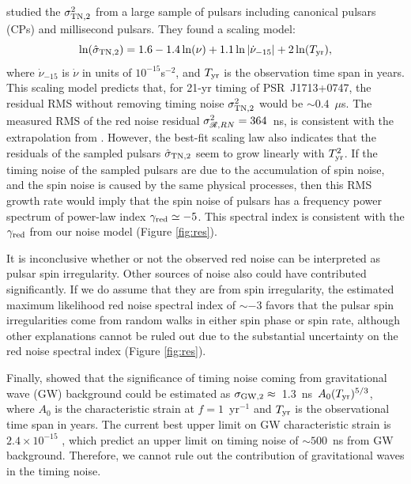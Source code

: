 \citet{sc10} studied the $\sigma^2_{\rm TN,2}$ from a large sample of pulsars
including canonical pulsars (CPs) and millisecond pulsars. They found a scaling
model:
\begin{equation}
\label{eq:sc10}
\ln(\hat{\sigma}_{\rm TN,2}) = 1.6 - 1.4\ln(\nu) +
1.1\ln|\dot{\nu}_{-15}|+2\ln(T_{\rm yr}),
\end{equation}
where $\dot{\nu}_{-15}$ is $\dot{\nu}$ in units of $10^{-15}$s$^{-2}$, and $T_{\rm yr}$
is the observation time span in years.
This scaling model predicts that, for 21-yr timing of PSR~J1713+0747, the
residual RMS without removing timing noise $\sigma^2_{\rm TN,2}$ would be
$\sim0.4$~$\mu $s. The measured RMS of the red noise residual 
$\sigma^2_{\mathscr{R},RN}=364$~ns, is consistent with the extrapolation
from \citet{sc10}.  
However, the best-fit scaling law also indicates that the residuals of the
sampled pulsars $\hat{\sigma}_{\rm TN,2}$ seem to grow linearly with $T_{\rm yr}^2$. 
If the timing noise of the sampled pulsars are due to the accumulation of 
spin noise, and the spin noise is caused by the same physical processes,
then this RMS growth rate would imply that the spin noise of pulsars has a
frequency power spectrum of power-law index $\gamma_{\rm red}\simeq-5$. This 
spectral index is consistent with the $\gamma_{\rm red}$
from our noise model (Figure \ref{fig:res}).

It is inconclusive whether or not the observed red noise can be interpreted as pulsar spin irregularity.
Other sources of noise also could have contributed significantly.
If we do assume that they are from spin irregularity, 
the estimated maximum likelihood red noise spectral index of $\sim-3$ 
favors that the pulsar spin irregularities come from
random walks in either spin phase or spin rate, although other explanations cannot be ruled out due to the
substantial uncertainty on the red noise spectral index (Figure \ref{fig:res}).

Finally, \citet{sc10} showed that the significance of timing noise coming from
gravitational wave (GW) background could be estimated as
$\sigma_{\rm GW,2} \approx$~1.3~ns~$A_0(T_{\rm yr})^{5/3}$, where $A_0$ is the
characteristic strain at $f=1$~yr$^{-1}$ and $T_{\rm yr}$ is the observational
time span in years. The current best upper limit on GW characteristic 
strain is $2.4\times10^{-15}$ \citep{src+13}, which predict an upper limit on
timing noise of $\sim500$~ns from GW background. Therefore, we
cannot rule out the contribution of gravitational waves in the timing noise.


